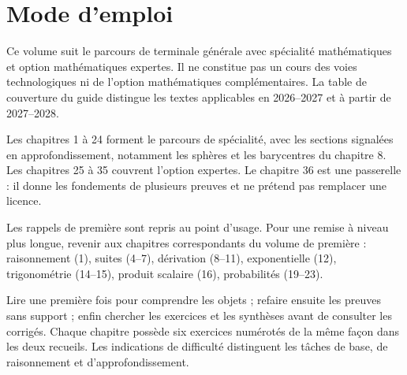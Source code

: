 \documentclass[11pt,a4paper,oneside]{book}
\begin{document}
\frontmatter
\chapter*{Mode d'emploi}
Ce volume suit le parcours de terminale générale avec spécialité mathématiques et option mathématiques expertes. Il ne constitue pas un cours des voies technologiques ni de l'option mathématiques complémentaires. La table de couverture du guide distingue les textes applicables en 2026--2027 et à partir de 2027--2028.

Les chapitres 1 à 24 forment le parcours de spécialité, avec les sections signalées en approfondissement, notamment les sphères et les barycentres du chapitre 8. Les chapitres 25 à 35 couvrent l'option expertes. Le chapitre 36 est une passerelle : il donne les fondements de plusieurs preuves et ne prétend pas remplacer une licence.

Les rappels de première sont repris au point d'usage. Pour une remise à niveau plus longue, revenir aux chapitres correspondants du volume de première : raisonnement (1), suites (4--7), dérivation (8--11), exponentielle (12), trigonométrie (14--15), produit scalaire (16), probabilités (19--23).

Lire une première fois pour comprendre les objets ; refaire ensuite les preuves sans support ; enfin chercher les exercices et les synthèses avant de consulter les corrigés. Chaque chapitre possède six exercices numérotés de la même façon dans les deux recueils. Les indications de difficulté distinguent les tâches de base, de raisonnement et d'approfondissement.
\end{document}
